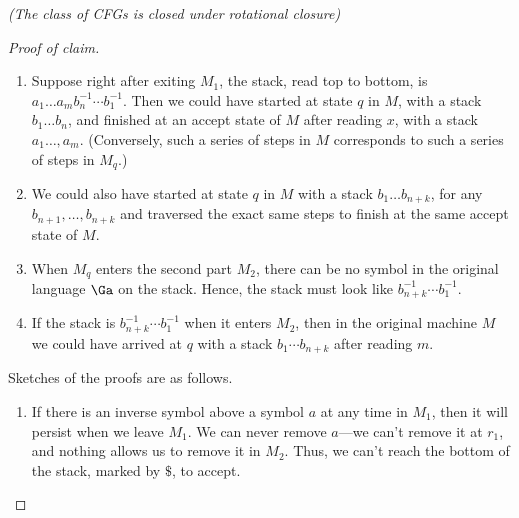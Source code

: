\begin{problem}{\it(The class of CFGs is closed under rotational closure)}
\begin{proof}[Proof of claim]
\begin{enumerate}
At every time in $M_1$, there can be no inverse symbol (such as $a^{-1}$) above a symbol in the original stack language (such as $a$). Thus right after exiting $M_1$, the stack, read top to bottom, looks like $a_1\ldots a_mb_n^{-1}\cdots b_1^{-1}$.
\item
Suppose right after exiting $M_1$, the stack, read top to bottom, is $a_1\ldots a_mb_n^{-1}\cdots b_1^{-1}$. Then we could have started at state $q$ in $M$, with a stack $b_1\ldots b_n$, and finished at an accept state of $M$ after reading $x$, with a stack $a_1\ldots, a_m$. (Conversely, such a series of steps in $M$ corresponds to such a series of steps in $M_q$.)
\item
We could also have started at state $q$ in $M$ with a stack $b_1\ldots b_{n+k}$, for any $b_{n+1},\ldots, b_{n+k}$ and traversed the exact same steps to finish at the same accept state of $M$. 
\item
When $M_q$ enters the second part $M_2$, there can be no symbol in the original language $\Ga$ on the stack. Hence, the stack must look like $b_{n+k}^{-1}\cdots b_1^{-1}$.
\item
If the stack is $b_{n+k}^{-1}\cdots b_1^{-1}$ when it enters $M_2$, then in the original machine $M$ we could have arrived at $q$ with a stack $b_1\cdots b_{n+k}$ after reading $m$. 
\end{enumerate}
Sketches of the proofs are as follows.
\begin{enumerate}
\item
If there is an inverse symbol above a symbol $a$ at any time in $M_1$, then it will persist when we leave $M_1$. We can never remove $a$---we can't remove it at $r_1$, and nothing allows us to remove it in $M_2$. Thus, we can't reach the bottom of the stack, marked by $\$$, to accept.


\end{enumerate}
\end{proof}
\end{problem}
